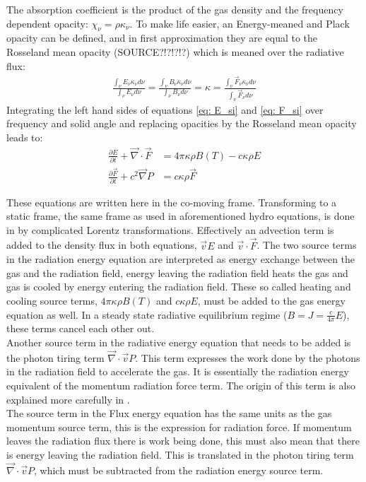 The absorption coefficient is the product of the gas density and the frequency dependent opacity: $\chi_\nu = \rho \kappa_\nu$. To make life easier, an Energy-meaned and Plack opacity can be defined, and in first approximation they are equal to the Rosseland mean opacity (SOURCE?!?!?!?) which is meaned over the radiative flux:
\begin{align}
\frac{\int_\nu E_\nu \kappa_\nu d\nu}{\int_\nu E_\nu d\nu} = \frac{\int_\nu B_\nu \kappa_\nu d\nu}{\int_\nu B_\nu d\nu} = \kappa = \frac{\int_\nu \vec{F}_\nu \kappa_\nu d\nu}{\int_\nu \vec{F}_\nu d\nu}
\end{align}
Integrating the left hand sides of equations \ref{eq: E_si} and \ref{eq: F_si} over frequency and solid angle and replacing opacities by the Rosseland mean opacity leads to:
\begin{align}
\frac{\partial E}{\partial t} + \vec{\nabla} \cdot \vec{F} &= 4\pi \kappa\rho B(T) - c \kappa \rho E\\
\frac{\partial \vec{F}}{\partial t} + c^2 \vec{\nabla} P &=  c \kappa \rho \vec{F} 
\end{align}

These equations are written here in the co-moving frame. Transforming to a static frame, the same frame as used in aforementioned hydro equations, is done in \cite{Mihalas1984a} by complicated Lorentz transformations. Effectively an advection term is added to the density flux in  both equations, $\vec{v} E$ and $\vec{v} \cdot \vec{F}$. The two source terms in the radiation energy equation are interpreted as energy exchange between the gas and the radiation field, energy leaving the radiation field heats the gas and gas is cooled by energy entering the radiation field. These so called heating and cooling source terms, $4\pi \kappa\rho B(T)$ and $ c \kappa \rho E$, must be added to the gas energy equation as well. In a steady state radiative equilibrium regime ($ B = J = \frac{c}{4\pi}E$), these terms cancel each other out.\\

Another source term in the radiative energy equation that needs to be added is the photon tiring term $\vec{\nabla} \cdot \vec{v} P $. This term expresses the work done by the photons in the radiation field to accelerate the gas. It is essentially the radiation energy equivalent of the momentum radiation force term. The origin of this term is also explained more carefully in \cite{Mihalas1984a}. \\

The source term in the Flux energy equation has the same units as the gas momentum source term, this is the expression for radiation force. If momentum leaves the radiation flux there is work being done, this must also mean that there is energy leaving the radiation field. This is translated in the photon tiring term $\vec{\nabla} \cdot \vec{v} P$, which must be subtracted from the radiation energy source term.

